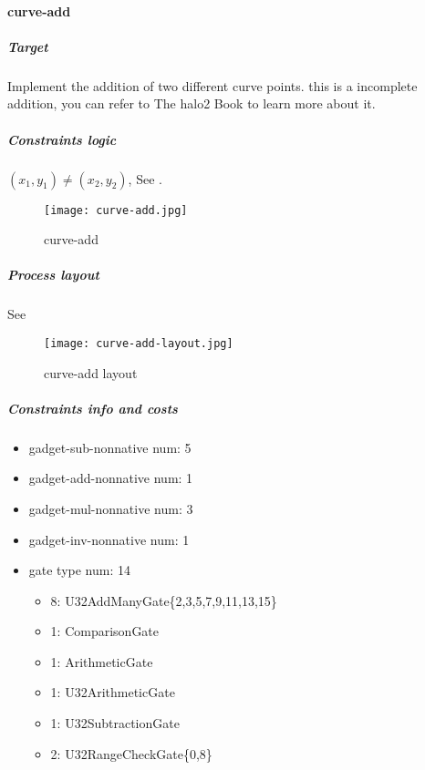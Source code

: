 \paragraph{curve-add}

\subparagraph{Target}
Implement the addition of two different curve points. this is a incomplete addition, you can refer to The halo2 Book \cite{website:halo2-book} to learn more about it.

\subparagraph{Constraints logic}
$(x_1,y_1) \ne (x_2,y_2)$, See .
\begin{figure}[!ht]
    \centering
    \texttt{[image: curve-add.jpg]}
    \caption{curve-add}
    \label{fig:curve-add}
\end{figure}

\subparagraph{Process layout}
See 
\begin{figure}[!ht]
    \centering
    \texttt{[image: curve-add-layout.jpg]}
    \caption{curve-add layout}
    \label{fig:curve-add-layout}
\end{figure}

\subparagraph{Constraints info and costs}
\begin{itemize}
    \item gadget-sub-nonnative num: 5
    \item gadget-add-nonnative num: 1
    \item gadget-mul-nonnative num: 3
    \item gadget-inv-nonnative num: 1
    \item gate type num: 14
        \begin{itemize}
            \item 8: U32AddManyGate\{2,3,5,7,9,11,13,15\}
            \item 1: ComparisonGate
            \item 1: ArithmeticGate
            \item 1: U32ArithmeticGate
            \item 1: U32SubtractionGate
            \item 2: U32RangeCheckGate\{0,8\}
        \end{itemize}
\end{itemize}
